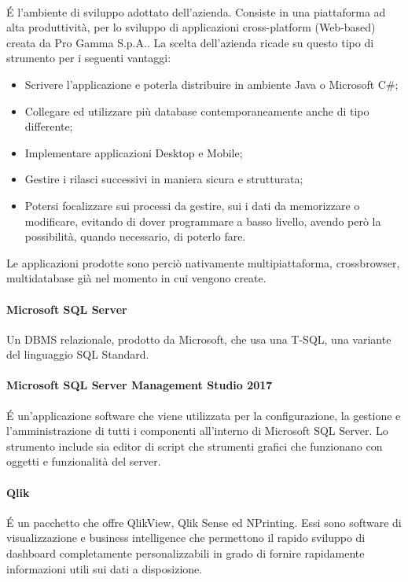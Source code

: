 \paragraph{\inde} \'E l'ambiente di sviluppo adottato dell'azienda. Consiste in una piattaforma ad alta produttività, per lo sviluppo di applicazioni cross-platform (Web-based) creata da Pro Gamma S.p.A.. La scelta dell'azienda ricade su questo tipo di strumento per i seguenti vantaggi:
\begin{itemize}
	\item Scrivere l'applicazione e poterla distribuire in ambiente Java o Microsoft C\#;
	\item Collegare ed utilizzare più database contemporaneamente anche di tipo differente;
	\item Implementare applicazioni Desktop e Mobile;
	\item Gestire i rilasci successivi in maniera sicura e strutturata;
	\item Potersi focalizzare sui processi da gestire, sui i dati da memorizzare o modificare, evitando di dover programmare a basso livello, avendo però la possibilità, quando necessario, di poterlo fare.
\end{itemize}
Le applicazioni prodotte sono perciò nativamente multipiattaforma, crossbrowser, multidatabase già nel momento in cui vengono create.

\paragraph{Microsoft SQL Server} Un DBMS relazionale, prodotto da Microsoft, che usa una T-SQL, una variante del linguaggio SQL Standard. 

\paragraph{Microsoft SQL Server Management Studio 2017} \'E un'applicazione software che viene utilizzata per la configurazione, la gestione e l'amministrazione di tutti i componenti all'interno di Microsoft SQL Server. Lo strumento include sia editor di script che strumenti grafici che funzionano con oggetti e funzionalità del server.

\paragraph{Qlik}\'E un pacchetto che offre QlikView, Qlik Sense ed NPrinting. Essi sono software di visualizzazione e business intelligence che permettono il rapido sviluppo di dashboard completamente personalizzabili in grado di fornire rapidamente informazioni utili sui dati a disposizione.

